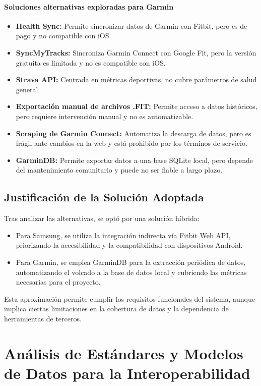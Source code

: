 \paragraph{Soluciones alternativas exploradas para Garmin}
\begin{itemize}
    \item \textbf{Health Sync:} Permite sincronizar datos de Garmin con Fitbit, pero es de pago y no compatible con iOS.
    \item \textbf{SyncMyTracks:} Sincroniza Garmin Connect con Google Fit, pero la versión gratuita es limitada y no es compatible con iOS.
    \item \textbf{Strava API:} Centrada en métricas deportivas, no cubre parámetros de salud general.
    \item \textbf{Exportación manual de archivos .FIT:} Permite acceso a datos históricos, pero requiere intervención manual y no es automatizable.
    \item \textbf{Scraping de Garmin Connect:} Automatiza la descarga de datos, pero es frágil ante cambios en la web y está prohibido por los términos de servicio.
    \item \textbf{GarminDB:} Permite exportar datos a una base SQLite local, pero depende del mantenimiento comunitario y puede no ser fiable a largo plazo.
\end{itemize}

\subsection{Justificación de la Solución Adoptada}
Tras analizar las alternativas, se optó por una solución híbrida:
\begin{itemize}
    \item Para Samsung, se utiliza la integración indirecta vía Fitbit Web API, priorizando la accesibilidad y la compatibilidad con dispositivos Android.
    \item Para Garmin, se emplea GarminDB para la extracción periódica de datos, automatizando el volcado a la base de datos local y cubriendo las métricas necesarias para el proyecto.
\end{itemize}
Esta aproximación permite cumplir los requisitos funcionales del sistema, aunque implica ciertas limitaciones en la cobertura de datos y la dependencia de herramientas de terceros.

\section{Análisis de Estándares y Modelos de Datos para la Interoperabilidad}

